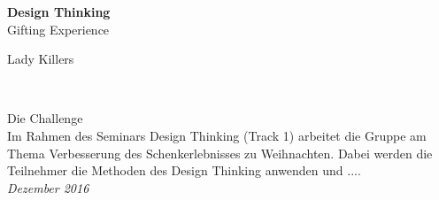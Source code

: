 \documentclass[12pt,ngerman, fleqn]{book} %
\begin{document}


\begingroup
\thispagestyle{empty}
\centering
\vspace*{5cm}
\par\normalfont\fontsize{35}{35}\sffamily\selectfont
\textbf{Design Thinking}\\
{\LARGE Gifting Experience}\par %
\vspace*{1cm}
{\Huge Lady Killers}\par %
\endgroup


\newpage
~\vfill
\thispagestyle{empty}




\noindent Die Challenge \\
Im Rahmen des Seminars Design Thinking (Track 1) arbeitet die Gruppe am Thema Verbesserung des Schenkerlebnisses zu Weihnachten. Dabei werden die Teilnehmer die Methoden des Design Thinking anwenden und .... \\ %

\noindent \textit{Dezember 2016} %
\end{document}
